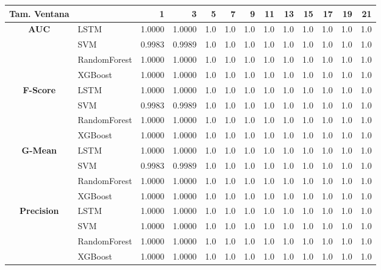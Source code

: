 \begin{table}[h]
	\centering
	\begin{adjustbox}{max width=11cm}
		\begin{tabular}{|c|l|r|r|r|r|r|r|r|r|r|r|r|}
			\hline
			\textbf{Tam. Ventana}&         &      1  &      3  &   5  &   7  &   9  &   11 &   13 &   15 &   17 &   19 &   21 \\
			\hline
			\textbf{AUC} & LSTM &  1.0000 &  1.0000 &  1.0 &  1.0 &  1.0 &  1.0 &  1.0 &  1.0 &  1.0 &  1.0 &  1.0 \\
			& SVM &  0.9983 &  0.9989 &  1.0 &  1.0 &  1.0 &  1.0 &  1.0 &  1.0 &  1.0 &  1.0 &  1.0 \\
			& RandomForest &  1.0000 &  1.0000 &  1.0 &  1.0 &  1.0 &  1.0 &  1.0 &  1.0 &  1.0 &  1.0 &  1.0 \\
			& XGBoost &  1.0000 &  1.0000 &  1.0 &  1.0 &  1.0 &  1.0 &  1.0 &  1.0 &  1.0 &  1.0 &  1.0 \\
			\hline
			\textbf{F-Score} & LSTM &  1.0000 &  1.0000 &  1.0 &  1.0 &  1.0 &  1.0 &  1.0 &  1.0 &  1.0 &  1.0 &  1.0 \\
			& SVM &  0.9983 &  0.9989 &  1.0 &  1.0 &  1.0 &  1.0 &  1.0 &  1.0 &  1.0 &  1.0 &  1.0 \\
			& RandomForest &  1.0000 &  1.0000 &  1.0 &  1.0 &  1.0 &  1.0 &  1.0 &  1.0 &  1.0 &  1.0 &  1.0 \\
			& XGBoost &  1.0000 &  1.0000 &  1.0 &  1.0 &  1.0 &  1.0 &  1.0 &  1.0 &  1.0 &  1.0 &  1.0 \\
			\hline
			\textbf{G-Mean} & LSTM &  1.0000 &  1.0000 &  1.0 &  1.0 &  1.0 &  1.0 &  1.0 &  1.0 &  1.0 &  1.0 &  1.0 \\
			& SVM &  0.9983 &  0.9989 &  1.0 &  1.0 &  1.0 &  1.0 &  1.0 &  1.0 &  1.0 &  1.0 &  1.0 \\
			& RandomForest &  1.0000 &  1.0000 &  1.0 &  1.0 &  1.0 &  1.0 &  1.0 &  1.0 &  1.0 &  1.0 &  1.0 \\
			& XGBoost &  1.0000 &  1.0000 &  1.0 &  1.0 &  1.0 &  1.0 &  1.0 &  1.0 &  1.0 &  1.0 &  1.0 \\
			\hline
			\textbf{Precision} & LSTM &  1.0000 &  1.0000 &  1.0 &  1.0 &  1.0 &  1.0 &  1.0 &  1.0 &  1.0 &  1.0 &  1.0 \\
			& SVM &  1.0000 &  1.0000 &  1.0 &  1.0 &  1.0 &  1.0 &  1.0 &  1.0 &  1.0 &  1.0 &  1.0 \\
			& RandomForest &  1.0000 &  1.0000 &  1.0 &  1.0 &  1.0 &  1.0 &  1.0 &  1.0 &  1.0 &  1.0 &  1.0 \\
			& XGBoost &  1.0000 &  1.0000 &  1.0 &  1.0 &  1.0 &  1.0 &  1.0 &  1.0 &  1.0 &  1.0 &  1.0 \\

\end{tabular}
\end{adjustbox}
\end{table}
